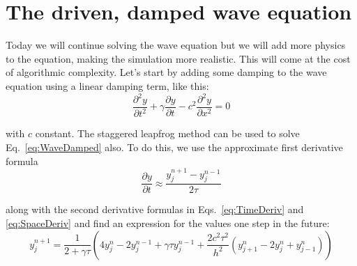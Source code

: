 \chapter{The driven, damped wave equation}
\label{Lab:14}
Today we will continue solving the wave equation but we will add more
physics to the equation, making the simulation more realistic.  This
will come at the cost of algorithmic complexity.  Let's start by
adding some damping to the wave equation using a linear damping term, like this:
\begin{equation}\label{eq:WaveDamped}
    \frac{\partial^2 y}{\partial t^2}
    + \gamma \frac{\partial y}{\partial t}
    - c^2 \frac{\partial^2 y}{\partial x^2} = 0
\end{equation}

 with $c$ constant.  The staggered leapfrog method can be used to
solve Eq.~\eqref{eq:WaveDamped} also.  To do this, we use the
approximate first derivative formula
\begin{equation}
    \frac{\partial y}{\partial t} \approx \frac{y_j^{n+1} -
    y_j^{n-1}}{2 \tau}
\end{equation}


along with the second derivative formulas in
Eqs.~\eqref{eq:TimeDeriv} and \eqref{eq:SpaceDeriv} and find an
expression for the values one step in the future:
\begin{equation}\label{eq:stlfDamped}
    y_j^{n+1} = \frac{1}{2+\gamma \tau} \left (
    4 y_j^n - 2y_j^{n-1} + \gamma \tau y_j^{n-1}
    + \frac{2 c^2 \tau^2}{h^2} \left( y_{j+1}^n - 2 y_j^n + y_{j-1}^n
    \right) \right)
\end{equation}


